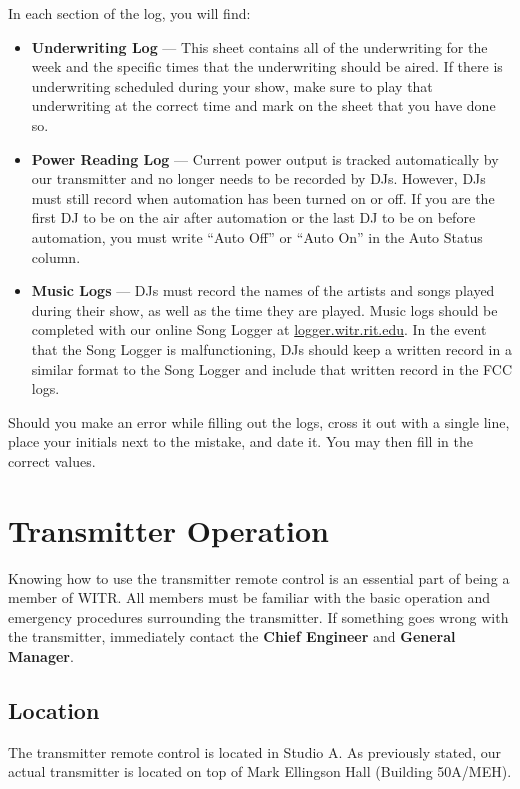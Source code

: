 \documentclass{witrman}
\begin{document}
In each section of the log, you will find:
\begin{itemize}
    \item \textbf{Underwriting Log} --- This sheet contains all of the
        underwriting for the week and the specific times that the underwriting
        should be aired. If there is underwriting scheduled during your show,
        make sure to play that underwriting at the correct time and mark on the
        sheet that you have done so.
    \item \textbf{Power Reading Log} --- Current power output is tracked
        automatically by our transmitter and no longer needs to be recorded by
        DJs.  However, DJs must still record when automation has been turned on
        or off. If you are the first DJ to be on the air after automation or the
        last DJ to be on before automation, you must write ``Auto Off'' or
        ``Auto On'' in the Auto Status column.
    \item \textbf{Music Logs} --- DJs must record the names of the artists and
        songs played during their show, as well as the time they are played.
        Music logs should be completed with our online Song Logger at
        \href{http://logger.witr.rit.edu}{logger.witr.rit.edu}. In the event
        that the Song Logger is malfunctioning, DJs should keep a written record
        in a similar format to the Song Logger and include that written record
        in the FCC logs.
\end{itemize}

Should you make an error while filling out the logs, cross it out with a single
line, place your initials next to the mistake, and date it. You may then fill in
the correct values.

\chapter{Transmitter Operation}
Knowing how to use the transmitter remote control is an essential part of being
a member of WITR\@. All members must be familiar with the basic operation and
emergency procedures surrounding the transmitter. If something goes wrong with
the transmitter, immediately contact the \textbf{Chief Engineer} and
\textbf{General Manager}.

\section{Location}
The transmitter remote control is located in Studio A. As previously stated, our
actual transmitter is located on top of Mark Ellingson Hall (Building 50A/MEH).
\end{document}
